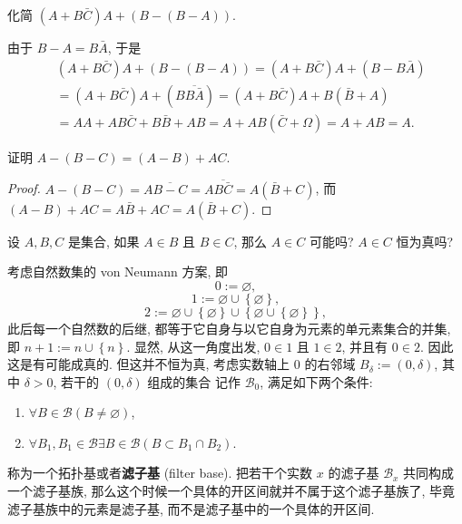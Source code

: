\documentclass[10pt,UTF8]{book} %
\begin{document}
\begin{exercise}
    化简 $\left(A + B\bar C \right) A + (B - (B - A))$.
    \begin{sol}
        由于 $B - A = B\bar A$, 于是
        \[ 
        \begin{aligned}
            &\left(A + B\bar C \right) A + (B - (B - A))
            = \left(A + B\bar C \right) A + (B - B\bar A) \\
            &= \left(A + B\bar C \right) A + (B \overline{B \bar A})
            = \left(A + B\bar C \right) A + B (\bar B + A) \\
            &= AA + AB\bar C + B\bar B + AB
            = A + AB \left( \bar C + \varOmega \right)
            = A + AB = A.
        \end{aligned}\]
    \end{sol}
\end{exercise}

\begin{exercise}
    证明 $A - (B - C) = (A - B) + AC$.
    \begin{proof}
        $A - (B - C) = A \overline{B-C} = A \overline{B \bar C}
        = A \left( \bar B + C \right)$,
        而 $(A-B) + AC = A\bar B + AC = A \left( \bar B + C \right)$.
    \end{proof}
\end{exercise}

\begin{exercise}
    设 $A,B,C$ 是集合, 如果 $A \in B$ 且 $B \in C$, 那么 $A \in C$ 可能吗?
    $A \in C$ 恒为真吗?
    \begin{cmt}
        考虑自然数集的 von Neumann 方案, 即
        \[ 0 := \varnothing, \]
        \[ 1 := \varnothing \cup \left\{ \varnothing \right\}, \]
        \[ 2 := \varnothing \cup \left\{ \varnothing \right\} \cup
        \left\{ \varnothing \cup \left\{ \varnothing \right\} \right\}, \]
        此后每一个自然数的后继, 都等于它自身与以它自身为元素的单元素集合的并集,
        即 $n+1 := n \cup \left\{n\right\}$.
        显然, 从这一角度出发, $0 \in 1$ 且 $1 \in 2$, 并且有 $0 \in 2$.
        因此这是有可能成真的.
        但这并不恒为真, 考虑实数轴上 $0$ 的右邻域 $B_\delta := (0, \delta)$,
        其中 $\delta > 0$, 若干的 $(0, \delta)$ 组成的集合
        记作 $\mathcal{B}_0$, 满足如下两个条件:
        \begin{enumerate}[label={$\left.\mathrm{B}_\arabic*\right)$}, itemsep=0pt]
            \item $\forall B \in \mathcal{B} \left(
                B \ne \varnothing
            \right)$,
            \item $\forall B_1, B_1 \in \mathcal{B} \exists B \in \mathcal{B} \left(
                B \subset B_1 \cap B_2
            \right)$.
        \end{enumerate}
        称为一个拓扑基或者\textbf{滤子基} (filter base). 把若干个实数 $x$ 的滤子基 $\mathcal{B}_x$
        共同构成一个滤子基族, 那么这个时候一个具体的开区间就并不属于这个滤子基族了,
        毕竟滤子基族中的元素是滤子基, 而不是滤子基中的一个具体的开区间.
    \end{cmt}
\end{exercise}
\end{document}
